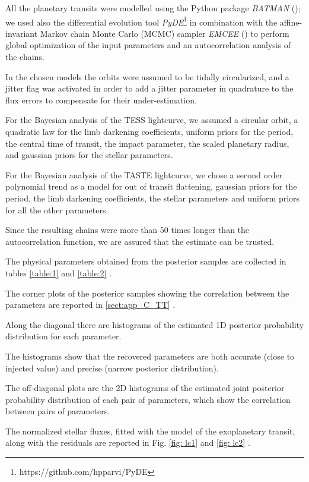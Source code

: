 \documentclass[a4paper,11pt,twocolumn]{article}
\begin{document}
All the planetary transits were modelled using the Python package \textit{BATMAN} (\cite{Kreidberg}); we used also the differential evolution tool \textit{PyDE}\footnote{https://github.com/hpparvi/PyDE} in combination with the affine-invariant Markov chain Monte Carlo (MCMC) sampler \textit{EMCEE} (\cite{Foreman}) to perform global optimization of the input parameters and an autocorrelation analysis of the chains.

In the chosen models the orbits were assumed to be tidally circularized, and a jitter flag was activated in order to add a jitter parameter in quadrature to the flux errors to compensate for their under-estimation.

For the Bayesian analysis of the TESS lightcurve, we assumed a circular orbit, a quadratic law for the limb darkening coefficients, uniform priors for the period, the central time of transit, the impact parameter, the scaled planetary radius, and gaussian priors for the stellar parameters.


For the Bayesian analysis of the TASTE lightcurve, we chose a second order polynomial trend as a model for out of transit flattening, gaussian priors for the period, the limb darkening coefficients, the stellar parameters and uniform priors for all the other parameters.

Since the resulting chains were more than 50 times longer than the autocorrelation function, we are assured that the estimate can be trusted.

The physical parameters obtained from the posterior samples are collected in tables \ref{table:1} and \ref{table:2} .

The corner plots of the posterior samples showing the correlation between the parameters are reported in \ref{sect:app_C_TT} .

Along the diagonal there are histograms of the estimated 1D posterior probability distribution for each parameter. 

The histograms show that the recovered parameters are both accurate (close to injected value) and precise (narrow posterior distribution). 

The off-diagonal plots are the 2D histograms of the estimated joint posterior probability distribution of each pair of parameters, which show the correlation between pairs of parameters.

The normalized stellar fluxes, fitted with the model of the exoplanetary transit, along with the residuals are reported in Fig. \ref{fig: lc1} and \ref{fig: lc2} .
\end{document}
